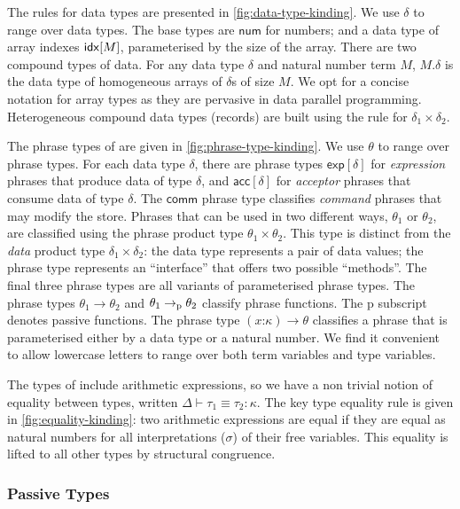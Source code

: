 The rules for data types are presented in \autoref{fig:data-type-kinding}. We use $\delta$ to range over data types. The base types are $\mathsf{num}$ for numbers; and a data type of array indexes $\mathsf{idx}[M]$, parameterised by the size of the array. There are two compound types of data. For any data type $\delta$ and natural number term $M$, $M.\delta$ is the data type of homogeneous arrays of $\delta$s of size $M$. We opt for a concise notation for array types as they are pervasive in data parallel programming. Heterogeneous compound data types (records) are built using the rule for $\delta_1 \times \delta_2$.

The phrase types of \DPIA are given in \autoref{fig:phrase-type-kinding}. We use $\theta$ to range over phrase types. For each data type $\delta$, there are phrase types $\mathsf{exp}[\delta]$ for \emph{expression} phrases that produce data of type $\delta$, and $\mathsf{acc}[\delta]$ for \emph{acceptor} phrases that consume data of type $\delta$. The $\mathsf{comm}$ phrase type classifies \emph{command} phrases that may modify the store. Phrases that can be used in two different ways, $\theta_1$ or $\theta_2$, are classified using the phrase product type $\theta_1 \times \theta_2$. This type is distinct from the \emph{data} product type $\delta_1 \times \delta_2$: the data type represents a pair of data values; the phrase type represents an ``interface'' that offers two possible ``methods''.
The final three phrase types are all variants of parameterised phrase types. The phrase types $\theta_1 \to \theta_2$ and $\theta_1 \to_{\textrm{p}} \theta_2$ classify phrase functions. The $\mathrm{p}$ subscript denotes passive functions. The phrase type $(x\mathord:\kappa) \to \theta$ classifies a phrase that is parameterised either by a data type or a natural number. We find it convenient to allow lowercase letters to range over both term variables and type variables.

The types of \DPIA include arithmetic expressions, so we have a non trivial notion of equality between types, written $\Delta \vdash \tau_1 \equiv \tau_2 : \kappa$. The key type equality rule is given in \autoref{fig:equality-kinding}: two arithmetic expressions are equal if they are equal as natural numbers for all interpretations ($\sigma$) of their free variables. This equality is lifted to all other types by structural congruence.

\subsubsection{Passive Types}
\label{sec:passive-types}

